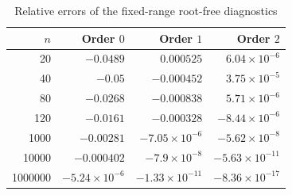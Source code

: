 \begin{table}[htbp]\centering\small
\caption{Relative errors of the fixed-range root-free diagnostics}\label{tab:diagnostic}
\begin{tabular}{r r r r}\toprule
$n$ & Order $0$ & Order $1$ & Order $2$ \\\midrule
20 & $-0.0489$ & $0.000525$ & $6.04\times10^{-6}$\\
40 & $-0.05$ & $-0.000452$ & $3.75\times10^{-5}$\\
80 & $-0.0268$ & $-0.000838$ & $5.71\times10^{-6}$\\
120 & $-0.0161$ & $-0.000328$ & $-8.44\times10^{-6}$\\
1000 & $-0.00281$ & $-7.05\times10^{-6}$ & $-5.62\times10^{-8}$\\
10000 & $-0.000402$ & $-7.9\times10^{-8}$ & $-5.63\times10^{-11}$\\
1000000 & $-5.24\times10^{-6}$ & $-1.33\times10^{-11}$ & $-8.36\times10^{-17}$\\
\bottomrule\end{tabular}\end{table}

